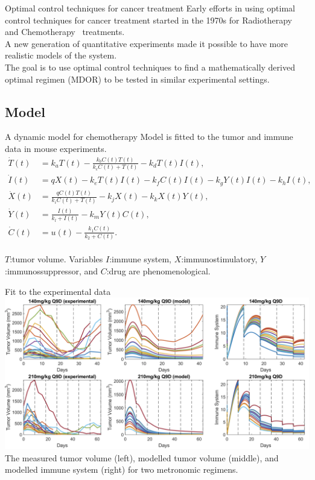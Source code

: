 \documentclass[10pt]{beamer}
\begin{document}
\begin{frame}{Optimal control techniques for cancer treatment}
	Early efforts in using optimal control techniques for cancer treatment started in the 1970s for Radiotherapy~ and Chemotherapy~ treatments. \\
	\vspace{0.5cm}
	A new generation of quantitative experiments made it possible to have more realistic models of the system. \\
	\vspace{0.5cm}
	The goal is to use optimal control techniques to find a mathematically derived optimal regimen (MDOR) to be tested in similar experimental settings.
\end{frame}

\subsection{Model}
\begin{frame}{A dynamic model for chemotherapy}
	\small
	Model is fitted to the tumor and immune data in mouse experiments.\\
	\begin{subequations} \label{eq:chemo1}
		\begin{align} 
			\dot{T}(t) &=  k_{a} T(t) - \frac{k_{b}C(t)T(t)}{k_{c}C(t)+T(t)} - k_{d}T(t)I(t),\\
			\dot{I}(t) &= q X(t) -k_{e}T(t)I(t)-k_{f}C(t)I(t)-k_{g}Y(t)I(t)-k_{h}I(t),\\
			\dot{X}(t) &= \frac{q C(t)T(t)}{k_{i}C(t)+T(t)}-k_{j}X(t)-k_{k}X(t)Y(t),\\
			\dot{Y}(t) &= \frac{I(t)}{k_l+I(t)} - k_{m}Y(t) C(t),\\
			\dot{C}(t) &= u(t) - \frac{k_1 C(t)}{k_2 + C(t)}.
		\end{align}
	\end{subequations} \\ 
	$T$:tumor volume. Variables $I$:immune system, $X$:immunostimulatory, $Y$:immunossuppressor, and $C$:drug are phenomenological. 
\end{frame}

\begin{frame}{Fit to the experimental data}
	\includegraphics[width=1\linewidth]{chemo-fits.png} \\ \vspace{0.5cm}
	\small
	The measured tumor volume (left), modelled tumor volume (middle), and modelled immune system (right) for two metronomic regimens.
\end{frame}
\end{document}
